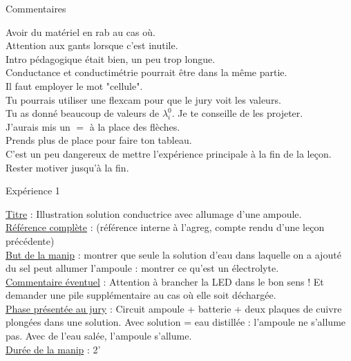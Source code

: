\begin{reportBlock}{Commentaires}

Avoir du matériel en rab au cas où. \\
Attention aux gants lorsque c'est inutile. \\
Intro pédagogique était bien, un peu trop longue. \\
Conductance et conductimétrie pourrait être dans la même partie. \\
Il faut employer le mot "cellule". \\
Tu pourrais utiliser une flexcam pour que le jury voit les valeurs. \\
Tu as donné beaucoup de valeurs de $\lambda_i^0$. Je te conseille de les projeter. \\
J'aurais mis un $=$ à la place des flèches. \\
Prends plus de place pour faire ton tableau. \\
C'est un peu dangereux de mettre l'expérience principale à la fin de la leçon. \\
Rester motiver jusqu'à la fin.


\end{reportBlock}


\begin{reportBlock}{Expérience 1}

\underline{Titre} : Illustration solution conductrice avec allumage d'une ampoule. \\

\underline{Référence complète} : (référence interne à l'agreg, compte rendu d'une leçon précédente) \\ 

\underline{But de la manip} : montrer que seule la solution d'eau dans laquelle on a ajouté du sel peut allumer l'ampoule : montrer ce qu'est un électrolyte. \\

\underline{Commentaire éventuel} : Attention à brancher la LED dans le bon sens ! Et demander une pile supplémentaire au cas où elle soit déchargée. \\

\underline{Phase présentée au jury} : Circuit ampoule + batterie + deux plaques de cuivre plongées dans une solution. Avec solution = eau distillée : l'ampoule ne s'allume pas. Avec de l'eau salée, l'ampoule s'allume.  \\

\underline{Durée de la manip} : 2' \\

\end{reportBlock}




